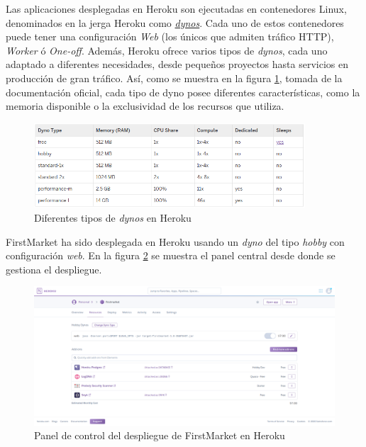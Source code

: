\documentclass[a4paper,12pt,twoside,openright]{report}
\begin{document}
    Las aplicaciones desplegadas en Heroku son ejecutadas en contenedores Linux, denominados en la jerga Heroku como \href{https://devcenter.heroku.com/articles/dynos}{\emph{dynos}}. Cada uno de estos contenedores puede tener una configuración \emph{Web} (los únicos que admiten tráfico HTTP), \emph{Worker} ó \emph{One-off}. Además, Heroku ofrece varios tipos de \emph{dynos}, cada uno adaptado a diferentes necesidades, desde pequeños proyectos hasta servicios en producción de gran tráfico. Así, como se muestra en la figura \ref{fig:dyno_types}, tomada de la documentación oficial, cada tipo de dyno posee diferentes características, como la memoria disponible o la exclusividad de los recursos que utiliza.
    
    \begin{figure}[hbt!]
       	\centering
       	\includegraphics[width=0.9\textwidth,keepaspectratio]{dyno_types}
       	\caption{Diferentes tipos de \emph{dynos} en Heroku}
       	\label{fig:dyno_types}
    \end{figure}
    
    FirstMarket ha sido desplegada en Heroku usando un \emph{dyno} del tipo \emph{hobby} con configuración \emph{web}. En la figura \ref{fig:heroku} se muestra el panel central desde donde se gestiona el despliegue.
    
    \begin{figure}[hbt!]
       	\centering
       	\includegraphics[width=\textwidth,keepaspectratio]{heroku}
       	\caption{Panel de control del despliegue de FirstMarket en Heroku}
       	\label{fig:heroku}
    \end{figure}
\end{document}
